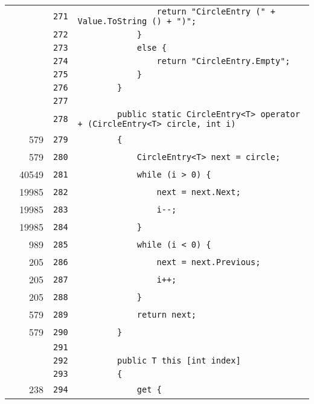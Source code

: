 \documentclass[a4paper,10pt]{article}
\begin{document}
\begin{longtable}[l]{lrrl}
\cellcolor{gray} &  & \verb~271~ & \verb~                return "CircleEntry (" + Value.ToString () + ")";~\\
\cellcolor{gray} &  & \verb~272~ & \verb~            }~\\
\cellcolor{gray} &  & \verb~273~ & \verb~            else {~\\
\cellcolor{gray} &  & \verb~274~ & \verb~                return "CircleEntry.Empty";~\\
\cellcolor{gray} &  & \verb~275~ & \verb~            }~\\
\cellcolor{gray} &  & \verb~276~ & \verb~        }~\\
\cellcolor{gray} &  & \verb~277~ & \verb~~\\
\cellcolor{gray} &  & \verb~278~ & \verb~        public static CircleEntry<T> operator + (CircleEntry<T> circle, int i)~\\
\cellcolor{green} & 579 & \verb~279~ & \verb~        {~\\
\cellcolor{green} & 579 & \verb~280~ & \verb~            CircleEntry<T> next = circle;~\\
\cellcolor{green} & 40549 & \verb~281~ & \verb~            while (i > 0) {~\\
\cellcolor{green} & 19985 & \verb~282~ & \verb~                next = next.Next;~\\
\cellcolor{green} & 19985 & \verb~283~ & \verb~                i--;~\\
\cellcolor{green} & 19985 & \verb~284~ & \verb~            }~\\
\cellcolor{green} & 989 & \verb~285~ & \verb~            while (i < 0) {~\\
\cellcolor{green} & 205 & \verb~286~ & \verb~                next = next.Previous;~\\
\cellcolor{green} & 205 & \verb~287~ & \verb~                i++;~\\
\cellcolor{green} & 205 & \verb~288~ & \verb~            }~\\
\cellcolor{green} & 579 & \verb~289~ & \verb~            return next;~\\
\cellcolor{green} & 579 & \verb~290~ & \verb~        }~\\
\cellcolor{gray} &  & \verb~291~ & \verb~~\\
\cellcolor{gray} &  & \verb~292~ & \verb~        public T this [int index]~\\
\cellcolor{gray} &  & \verb~293~ & \verb~        {~\\
\cellcolor{green} & 238 & \verb~294~ & \verb~            get {~\\

\end{longtable}
\end{document}
